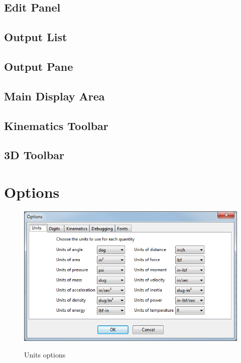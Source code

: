 \subsection{Edit Panel} \label{ssec:editPanel}
\subsection{Output List} \label{ssec:outputList}
\subsection{Output Pane} \label{ssec:outputPane}
\subsection{Main Display Area} \label{ssec:mainDisplayArea}
\subsection{Kinematics Toolbar} \label{ssec:kinematicsToolbar}
\subsection{3D Toolbar} \label{ssec:3DToolbar}

\section{Options} \label{sec:options}

\begin{figure}
\includegraphics[width=\textwidth]{images/optionsUnits} \label{fig:optionsUnits}
\caption{Units options}
\centering
\end{figure}

